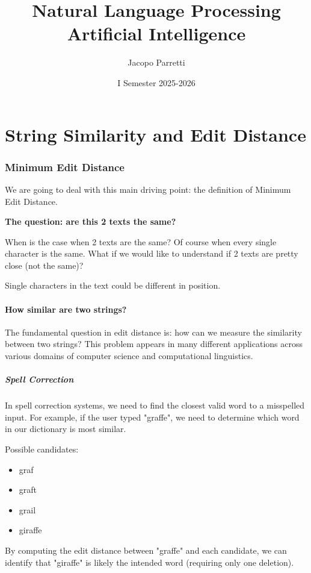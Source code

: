 \documentclass[11pt,a4paper]{article}
\title{\textbf{Natural Language Processing}\\
\large Artificial Intelligence}
\author{Jacopo Parretti}
\date{I Semester 2025-2026}
\theoremstyle{definition}
\theoremstyle{plain}
\theoremstyle{remark}
\begin{document}
\maketitle
\newpage
\tableofcontents
\newpage

\part{String Similarity and Edit Distance}

\section{Minimum Edit Distance}
We are going to deal with this main driving point: the definition of Minimum Edit Distance.

\textbf{The question: are this 2 texts the same?}

When is the case when 2 texts are the same? Of course when every single character is the same. 
What if we would like to understand if 2 texts are pretty close (not the same)?

Single characters in the text could be different in position.

\subsection{How similar are two strings?}

The fundamental question in edit distance is: how can we measure the similarity between two strings? This problem appears in many different applications across various domains of computer science and computational linguistics.

\subsubsection{Spell Correction}
In spell correction systems, we need to find the closest valid word to a misspelled input. For example, if the user typed "graffe", we need to determine which word in our dictionary is most similar.

Possible candidates:
\begin{itemize}
    \item graf
    \item graft
    \item grail
    \item giraffe
\end{itemize}

By computing the edit distance between "graffe" and each candidate, we can identify that "giraffe" is likely the intended word (requiring only one deletion).
\end{document}
